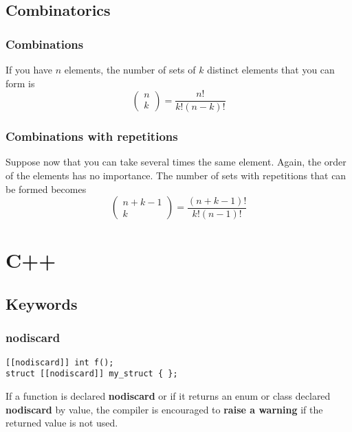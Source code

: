 \section{Combinatorics}
\subsection{Combinations}

If you have $n$ elements, the number of sets of $k$ distinct elements that you can form is
\begin{equation}
    \left( \begin{array}{c}
        n \\ k
    \end{array} \right)
     = \frac{n!}{k!(n-k)!}
\end{equation}

\subsection{Combinations with repetitions}

Suppose now that you can take several times the same element. Again, the order of the elements has no importance. The number of sets with repetitions that can be formed becomes
\begin{equation}
    \left(\begin{array}{c}
        n+k-1 \\ k
    \end{array} \right)
     = \frac{(n+k-1)!}{k!(n-1)!}
\end{equation}


\chapter{C++}

\section{Keywords}

\subsection{nodiscard}
\begin{lstlisting}
[[nodiscard]] int f();
struct [[nodiscard]] my_struct { };
\end{lstlisting}
If a function is declared \textbf{nodiscard} or if it returns an enum or class declared \textbf{nodiscard} by value, the compiler is encouraged to \textbf{raise a warning} if the returned value is not used.
